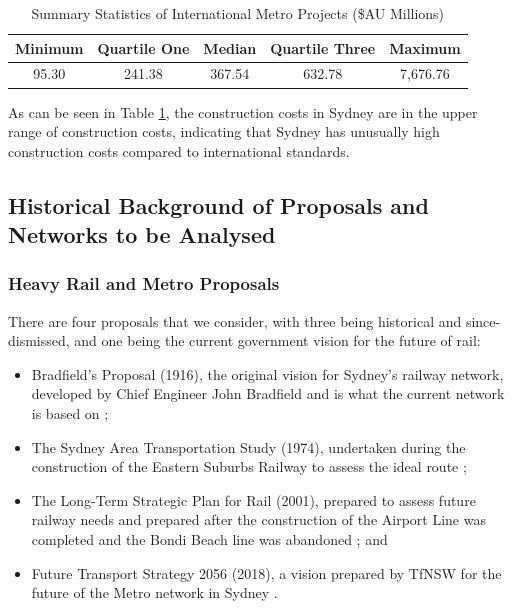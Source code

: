 \documentclass[preprint,12pt,authoryear]{elsarticle}
\begin{document}
\begin{table}[H]
\centering

 
\caption{Summary Statistics of International Metro Projects (\$AU Millions)}

\begin{tabular}{ccccc}
    \toprule

     \textbf{Minimum}& \textbf{Quartile One}& \textbf{Median}& \textbf{Quartile Three}& \textbf{Maximum}\\
    \midrule
  95.30& 241.38& 367.54& 632.78& 7,676.76\\
      \bottomrule
\end{tabular}
\label{tab:inter_rail_table}
\end{table}

As can be seen in Table \ref{tab:inter_rail_table}, the construction costs in Sydney are in the upper range of construction costs, indicating that Sydney has unusually high construction costs compared to international standards. 

\subsection{Historical Background of Proposals and Networks to be Analysed} \label{sec:historicalproposals}

\subsubsection{Heavy Rail and Metro Proposals }
There are four proposals that we consider, with three being historical and since-dismissed, and one being the current government vision for the future of rail:

\begin{itemize}
    \item Bradfield's Proposal (1916), the original vision for Sydney's railway network, developed by Chief Engineer John Bradfield and is what the current network is based on \parencite{bradfield1916}; 
    \item The Sydney Area Transportation Study (1974), undertaken during the construction of the Eastern Suburbs Railway to assess the ideal route \parencite{sats1974}; 
    \item The Long-Term Strategic Plan for Rail (2001), prepared to assess future railway needs and prepared after the construction of the Airport Line was completed and the Bondi Beach line was abandoned \parencite{rail2001}; and 
    \item Future Transport Strategy 2056 (2018), a vision prepared by TfNSW for the future of the Metro network in Sydney \parencite{transportNSW2018}.   
\end{itemize}
\end{document}
